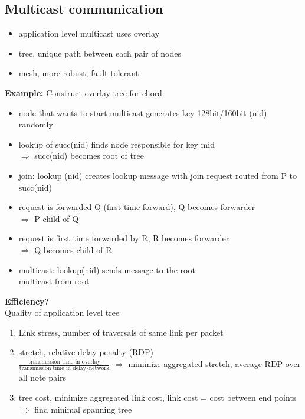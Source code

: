 \documentclass[ngerman,a4paper]{report}
\begin{document}
\subsection{Multicast communication}
\begin{itemize}
	\item application level multicast uses overlay
	\item tree, unique path between each pair of nodes
	\item mesh, more robust, fault-tolerant
\end{itemize}
\textbf{Example:} Construct overlay tree for chord
\begin{itemize}
	\item node that wants to start multicast generates key 128bit/160bit (nid) randomly
	\item lookup of succ(nid) finds node responsible for key mid\\
		$\Rightarrow$ succ(nid) becomes root of tree
	\item join: lookup (nid) creates lookup message with join request routed from P to succ(nid)
	\item request is forwarded Q (first time forward), Q becomes forwarder\\
		$\Rightarrow$ P child of Q
	\item request is first time forwarded by R, R becomes forwarder\\
		$\Rightarrow$ Q becomes child of R
	\item multicast: lookup(nid) sends message to the root\\
		multicast from root
\end{itemize}
\textbf{Efficiency?}\\
Quality of application level tree\\
\begin{enumerate}
	\item Link stress, number of traversals of same link per packet
	\item stretch, relative delay penalty (RDP)\\
		$\frac{\text{transmission time in overlay}}{\text{transmission time in delay/network}}$
		$\Rightarrow$ minimize aggregated stretch, average RDP over all note pairs
	\item tree cost, minimize aggregated link cost, link cost = cost between end points\\
		$\Rightarrow$ find minimal spanning tree
\end{enumerate}
\end{document}

